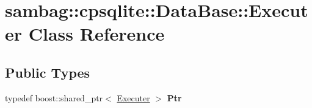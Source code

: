 \hypertarget{classsambag_1_1cpsqlite_1_1_data_base_1_1_executer}{
\section{sambag::cpsqlite::DataBase::Executer Class Reference}
\label{classsambag_1_1cpsqlite_1_1_data_base_1_1_executer}
}
\subsection*{Public Types}
\begin{DoxyCompactItemize}
\item 
\hypertarget{classsambag_1_1cpsqlite_1_1_data_base_1_1_executer_a74cf50b3764ad9517b6c877d3e2c3fda}{
typedef boost::shared\_\-ptr$<$ \hyperlink{classsambag_1_1cpsqlite_1_1_data_base_1_1_executer}{Executer} $>$ {\bfseries Ptr}}
\label{classsambag_1_1cpsqlite_1_1_data_base_1_1_executer_a74cf50b3764ad9517b6c877d3e2c3fda}

\end{DoxyCompactItemize}

